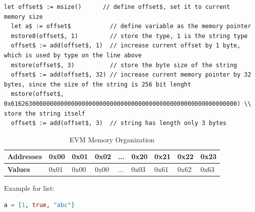 \begin{lstlisting}[caption={Generated yul code for string case}, language=yul]
  let offset$ := msize()      // define offset$, set it to current memory size 
  let a$ := offset$           // define variable as the memory pointer
  mstore8(offset$, 1)         // store the type, 1 is the string type
  offset$ := add(offset$, 1)  // increase current offset by 1 byte, which is used by type on the line above
  mstore(offset$, 3)          // store the byte size of the string
  offset$ := add(offset$, 32) // increase current memory pointer by 32 bytes, since the size of the string is 256 bit lenght
  mstore(offset$, 0x6162630000000000000000000000000000000000000000000000000000000000) \\ store the string itself
  offset$ := add(offset$, 3)  // string has length only 3 bytes
\end{lstlisting}
  
\begin{table}[h!]
  \centering
  \renewcommand{\arraystretch}{1.2} %
  \begin{tabular}{|>{\centering\arraybackslash}m{2cm}|>{\centering\arraybackslash}m{1cm}|>{\centering\arraybackslash}m{1cm}|>{\centering\arraybackslash}m{1cm}|>{\centering\arraybackslash}m{0.75cm}|>{\centering\arraybackslash}m{1cm}|>{\centering\arraybackslash}m{1cm}|>{\centering\arraybackslash}m{1cm}|>{\centering\arraybackslash}m{1cm}|}
  \hline
  \textbf{Addresses} & 0x00 & 0x01 & 0x02 & ... & 0x20 & 0x21 & 0x22 & 0x23 \\ \hline
  \textbf{Values}    & 0x01 & 0x00 & 0x00 & ... & 0x03 & 0x61 & 0x62 & 0x63 \\ \hline
  \end{tabular}
  \caption{EVM Memory Organization}
  \label{tab:evm_memory}
  \end{table}

Example for list:

\begin{lstlisting}[caption={Elixireum code for list case}, language=elixir]
  a = [1, true, "abc"]
\end{lstlisting}
  
